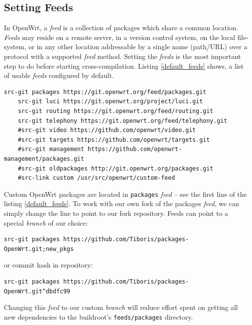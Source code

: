 \subsection{Setting Feeds}

In OpenWrt, a {\it feed} is a collection of packages which share a common location.
{\it Feeds} may reside on a remote server, in a version control system, on the local file-system, or in any other location addressable by a single name (path/URL) over a protocol with a supported {\it feed} method.
Setting the {\it feeds} is the most important step to do before starting cross-compilation.
Listing \ref{default_feeds} shows, a list of usable {\it feeds} configured by default.\newpage
\begin{lstlisting}[columns=fixed,basicstyle=\ttfamily\footnotesize,tabsize=4,label=default_feeds,caption=Content of feeds.conf.default]
    src-git packages https://git.openwrt.org/feed/packages.git
    src-git luci https://git.openwrt.org/project/luci.git
    src-git routing https://git.openwrt.org/feed/routing.git
    src-git telephony https://git.openwrt.org/feed/telephony.git
    #src-git video https://github.com/openwrt/video.git
    #src-git targets https://github.com/openwrt/targets.git
    #src-git management https://github.com/openwrt-management/packages.git
    #src-git oldpackages http://git.openwrt.org/packages.git
    #src-link custom /usr/src/openwrt/custom-feed
\end{lstlisting}
Custom OpenWrt packages are located in {\tt packages} {\it feed} -- see the first line of the listing \ref{default_feeds}.
To work with our own fork of the packages {\it feed}, we can simply change the line to point to our fork repository.
Feeds can point to a special {\it branch} of our choice:
\begin{lstlisting}[columns=fixed,basicstyle=\ttfamily\footnotesize,tabsize=4,backgroundcolor=\color{yellow!10}]
src-git packages https://github.com/Tiboris/packages-OpenWrt.git;new_pkgs
\end{lstlisting}
or commit hash in repository:
\begin{lstlisting}[columns=fixed,basicstyle=\ttfamily\footnotesize,tabsize=4,backgroundcolor=\color{yellow!10}]
src-git packages https://github.com/Tiboris/packages-OpenWrt.git^dbdfc99
\end{lstlisting}
Changing this {\it feed} to our custom {\it branch} will reduce effort spent on getting all new dependencies to the buildroot's {\tt feeds/packages} directory.

